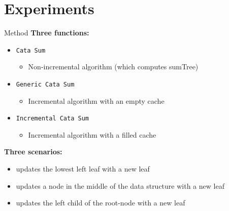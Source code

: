\section{Experiments}

\begin{slide}{Method}
\textbf{Three functions:}
\begin{itemize}
  \item \texttt{Cata Sum} 
  \begin{itemize}
    \item Non-incremental algorithm (which computes sumTree)
  \end{itemize}
  \item \texttt{Generic Cata Sum}
  \begin{itemize}
    \item Incremental algorithm with an empty cache
  \end{itemize}
  \item \texttt{Incremental Cata Sum}
  \begin{itemize}
    \item Incremental algorithm with a filled cache
  \end{itemize}
\end{itemize}

\textbf{Three scenarios:}
\begin{itemize}
\item{}   updates the lowest left leaf with a new leaf
\item{} updates a node in the middle of the data structure with a new leaf
\item{}    updates the left child of the root-node with a new leaf
\end{itemize} 

\end{slide}

